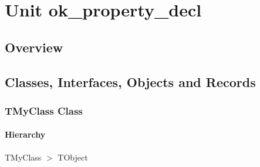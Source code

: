 \documentclass{report}
\newif\ifpdf
\begin{document}
\label{toc}\tableofcontents
\newpage
\newlength{\tmplength}
\chapter{Unit ok{\_}property{\_}decl}
\label{ok_property_decl}
\section{Overview}
\begin{description}
\item[\texttt{\begin{ttfamily}TMyClass\end{ttfamily} Class}]
\end{description}
\section{Classes, Interfaces, Objects and Records}
\ifpdf
\subsection*{\large{\textbf{TMyClass Class}}\normalsize\hspace{1ex}\hrulefill}
\else
\subsection*{TMyClass Class}
\fi
\label{ok_property_decl.TMyClass}
\subsubsection*{\large{\textbf{Hierarchy}}\normalsize\hspace{1ex}\hfill}
TMyClass {$>$} TObject
\end{document}
